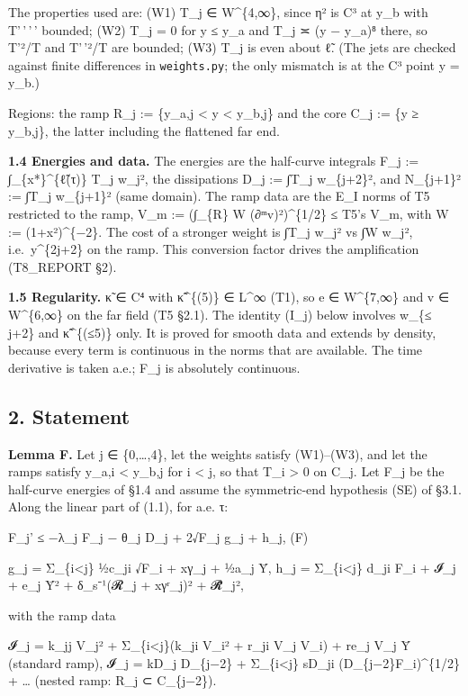 \documentclass[
]{article}
\begin{document}
The properties used are: (W1) T\_j ∈ W\^{}\{4,∞\}, since η² is C³ at
y\_b with T'\,'\,'\,' bounded; (W2) T\_j = 0 for y ≤ y\_a and T\_j ≍ (y
− y\_a)⁸ there, so T'²/T and T'\,'²/T are bounded; (W3) T\_j is even
about ℓ̃. (The jets are checked against finite differences in
\texttt{weights.py}; the only mismatch is at the C³ point y = y\_b.)

Regions: the ramp R\_j := \{y\_a,j \textless{} y \textless{} y\_b,j\}
and the core C\_j := \{y ≥ y\_b,j\}, the latter including the flattened
far end.

\textbf{1.4 Energies and data.} The energies are the half-curve
integrals F\_j := ∫\_\{x*\}\^{}\{ℓ̃(τ)\} T\_j w\_j², the dissipations
D\_j := ∫T\_j w\_\{j+2\}², and N\_\{j+1\}² := ∫T\_j w\_\{j+1\}² (same
domain). The ramp data are the E\_I norms of T5 restricted to the ramp,
V\_m := (∫\_\{R\} W (∂ᵐv)²)\^{}\{1/2\} ≤ T5's V\_m, with W :=
(1+x²)\^{}\{−2\}. The cost of a stronger weight is ∫T\_j w\_j² vs ∫W
w\_j², i.e.~y\^{}\{2j+2\} on the ramp. This conversion factor drives the
amplification (T8\_REPORT §2).

\textbf{1.5 Regularity.} κ̃ ∈ C⁴ with κ̃\^{}\{(5)\} ∈ L\^{}∞ (T1), so e ∈
W\^{}\{7,∞\} and v ∈ W\^{}\{6,∞\} on the far field (T5 §2.1). The
identity (I\_j) below involves w\_\{≤ j+2\} and κ̃\^{}\{(≤5)\} only. It
is proved for smooth data and extends by density, because every term is
continuous in the norms that are available. The time derivative is taken
a.e.; F\_j is absolutely continuous.

\hypertarget{statement}{%
\subsection{2. Statement}\label{statement}}

\textbf{Lemma F.} Let j ∈ \{0,\ldots,4\}, let the weights satisfy
(W1)--(W3), and let the ramps satisfy y\_a,i \textless{} y\_b,j for i
\textless{} j, so that T\_i \textgreater{} 0 on C\_j. Let F\_j be the
half-curve energies of §1.4 and assume the symmetric-end hypothesis (SE)
of §3.1. Along the linear part of (1.1), for a.e. τ:

F\_j' ≤ −λ\_j F\_j − θ\_j D\_j + 2√F\_j g\_j + h\_j, (F)

g\_j = Σ\_\{i\textless j\} ½c\_ji √F\_i + \textbar x\textbar γ\_j +
½a\_j Ȳ, h\_j = Σ\_\{i\textless j\} d\_ji F\_i + 𝓘\_j + e\_j Ȳ² +
δ\_s⁻¹(𝓡\_j + \textbar x\textbar γʳ\_j)² + 𝓡̂\_j²,

with the ramp data

𝓘\_j = k\_jj V\_j² + Σ\_\{i\textless j\}(k\_ji V\_i² + r\_ji V\_j V\_i)
+ re\_j V\_j Ȳ (standard ramp), 𝓘\_j = kD\_j D\_\{j−2\} +
Σ\_\{i\textless j\} sD\_ji (D\_\{j−2\}F\_i)\^{}\{1/2\} + \ldots{}
(nested ramp: R\_j ⊂ C\_\{j−2\}).
\end{document}
